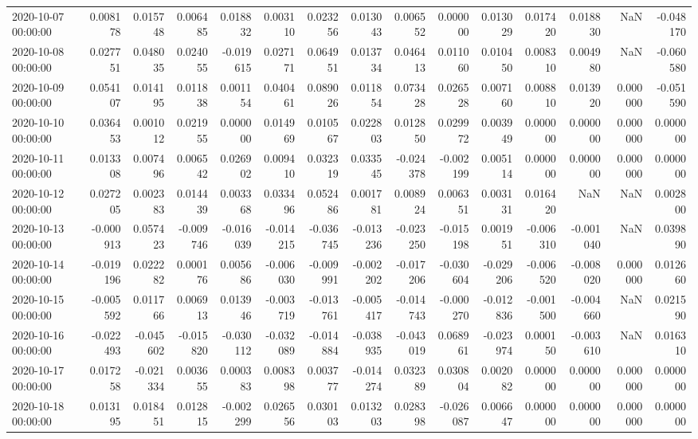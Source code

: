 \begin{tabular}{lrrrrrrrrrrrrrr}
2020-10-07 00:00:00 & 0.008178 & 0.015748 & 0.006485 & 0.018832 & 0.003110 & 0.023256 & 0.013043 & 0.006552 & 0.000000 & 0.013029 & 0.017420 & 0.018830 & NaN & -0.048170 \\
2020-10-08 00:00:00 & 0.027751 & 0.048035 & 0.024055 & -0.019615 & 0.027171 & 0.064951 & 0.013734 & 0.046413 & 0.011060 & 0.010450 & 0.008310 & 0.004980 & NaN & -0.060580 \\
2020-10-09 00:00:00 & 0.054107 & 0.014195 & 0.011838 & 0.001154 & 0.040461 & 0.089026 & 0.011854 & 0.073428 & 0.026528 & 0.007160 & 0.008810 & 0.013920 & 0.000000 & -0.051590 \\
2020-10-10 00:00:00 & 0.036453 & 0.001012 & 0.021955 & 0.000000 & 0.014969 & 0.010567 & 0.022803 & 0.012850 & 0.029972 & 0.003949 & 0.000000 & 0.000000 & 0.000000 & 0.000000 \\
2020-10-11 00:00:00 & 0.013308 & 0.007496 & 0.006542 & 0.026902 & 0.009410 & 0.032319 & 0.033545 & -0.024378 & -0.002199 & 0.005114 & 0.000000 & 0.000000 & 0.000000 & 0.000000 \\
2020-10-12 00:00:00 & 0.027205 & 0.002383 & 0.014439 & 0.003368 & 0.033496 & 0.052486 & 0.001781 & 0.008924 & 0.006351 & 0.003131 & 0.016420 & NaN & NaN & 0.002800 \\
2020-10-13 00:00:00 & -0.000913 & 0.057423 & -0.009746 & -0.016039 & -0.014215 & -0.036745 & -0.013236 & -0.023250 & -0.015198 & 0.001951 & -0.006310 & -0.001040 & NaN & 0.039890 \\
2020-10-14 00:00:00 & -0.019196 & 0.022282 & 0.000176 & 0.005686 & -0.006030 & -0.009991 & -0.002202 & -0.017206 & -0.030604 & -0.029206 & -0.006520 & -0.008020 & 0.000000 & 0.012660 \\
2020-10-15 00:00:00 & -0.005592 & 0.011766 & 0.006913 & 0.013946 & -0.003719 & -0.013761 & -0.005417 & -0.014743 & -0.000270 & -0.012836 & -0.001500 & -0.004660 & NaN & 0.021590 \\
2020-10-16 00:00:00 & -0.022493 & -0.045602 & -0.015820 & -0.030112 & -0.032089 & -0.014884 & -0.038935 & -0.043019 & 0.068961 & -0.023974 & 0.000150 & -0.003610 & NaN & 0.016310 \\
2020-10-17 00:00:00 & 0.017258 & -0.021334 & 0.003655 & 0.000383 & 0.008398 & 0.003777 & -0.014274 & 0.032389 & 0.030804 & 0.002082 & 0.000000 & 0.000000 & 0.000000 & 0.000000 \\
2020-10-18 00:00:00 & 0.013195 & 0.018451 & 0.012815 & -0.002299 & 0.026556 & 0.030103 & 0.013203 & 0.028398 & -0.026087 & 0.006647 & 0.000000 & 0.000000 & 0.000000 & 0.000000 \\

\end{tabular}
